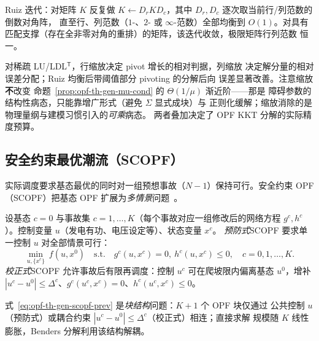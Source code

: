 \begin{definition}\label{def:opf-th-gen-ruiz}
Ruiz 迭代\cite{opft:ruiz}：对矩阵 $K$ 反复做
$K\leftarrow D_rKD_c$，其中 $D_r,D_c$ 逐次取当前行/列范数的倒数对角阵，
直至行、列范数（$1$-、$2$- 或 $\infty$-范数）全部均衡到 $O(1)$。对具有
匹配支撑（存在全非零对角的重排）的矩阵，该迭代收敛，极限矩阵行列范数
恒一。
\end{definition}

\begin{remark}[缩放与分解精度]\label{rem:opf-th-gen-scaling-effect}
对稀疏 LU/LDL$^{\mathsf T}$，行缩放决定 pivot 增长的相对判据，列缩放
决定解分量的相对误差分配；Ruiz 均衡后带阈值部分 pivoting 的分解后向
误差显著改善\cite{opft:ruiz}。注意缩放\textbf{不}改变
命题~\ref{prop:opf-th-gen-mu-cond} 的 $\Theta(1/\mu)$ 渐近阶——那是
障碍参数的结构性病态，只能靠增广形式（避免 $\Sigma$ 显式成块）与
正则化缓解；缩放消除的是物理量纲与建模习惯引入的\emph{可乘}病态。
两者叠加决定了 OPF KKT 分解的实际精度预算。
\end{remark}

\subsection{安全约束最优潮流（SCOPF）}\label{sec:opf-th-gen-scopf}

实际调度要求基态最优的同时对一组预想事故（$N\!-\!1$）保持可行。安全约束 OPF
（SCOPF）把基态 OPF 扩展为\emph{多情景}问题~\cite{opft:capitanescu-scopf}。

\begin{definition}\label{def:opf-th-gen-scopf}
设基态 $c=0$ 与事故集 $c=1,\dots,K$（每个事故对应一组修改后的网络方程
$g^c,h^c$）。控制变量 $u$（发电有功、电压设定等）、状态变量 $x^c$。
\emph{预防式}SCOPF 要求单一控制 $u$ 对全部情景可行：
\begin{equation}
\min_{u,\{x^c\}}\ f(u,x^0)\quad\text{s.t.}\quad
g^c(u,x^c)=0,\ h^c(u,x^c)\le0,\quad c=0,1,\dots,K .
\label{eq:opf-th-gen-scopf-prev}
\end{equation}
\emph{校正式}SCOPF 允许事故后有限再调度：控制 $u^c$ 可在爬坡限内偏离基态
$u^0$，增补 $|u^c-u^0|\le\Delta^c$、$g^c(u^c,x^c)=0$、$h^c(u^c,x^c)\le0$。
\end{definition}

式~\eqref{eq:opf-th-gen-scopf-prev} 是\emph{块结构}问题：$K+1$ 个 OPF 块仅通过
公共控制 $u$（预防式）或耦合约束 $|u^c-u^0|\le\Delta^c$（校正式）相连；直接求解
规模随 $K$ 线性膨胀，Benders 分解利用该结构解耦。

